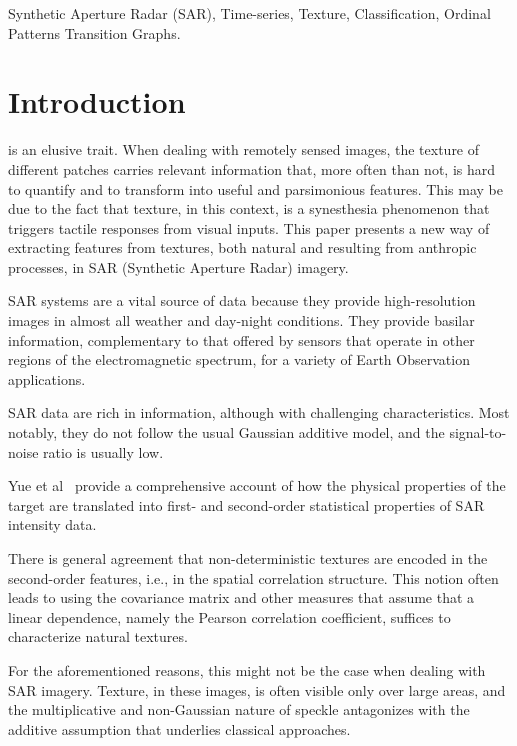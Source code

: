 \documentclass[journal]{IEEEtran}
\begin{document}
\begin{IEEEkeywords}
	Synthetic Aperture Radar (SAR), 
	Time-series, 
	Texture, 
	Classification, 
	Ordinal Patterns Transition Graphs.
\end{IEEEkeywords}

\IEEEpeerreviewmaketitle

\section{Introduction}

 is an elusive trait.
When dealing with remotely sensed images, the texture of different patches carries relevant information that, more often than not, is hard to quantify and to transform into useful and parsimonious features.
This may be due to the fact that texture, in this context, is a synesthesia phenomenon that triggers tactile responses from visual inputs.
This paper presents a new way of extracting features from textures, both natural and resulting from anthropic processes, in SAR (Synthetic Aperture Radar) imagery.

SAR systems are a vital source of data because they provide high-resolution images in almost all weather and day-night conditions.
They provide basilar information, complementary to that offered by sensors that operate in other regions of the electromagnetic spectrum, for a variety of Earth Observation applications.

SAR data are rich in information, although with challenging characteristics.
Most notably, they do not follow the usual Gaussian additive model, and the signal-to-noise ratio is usually low.

Yue et al~\cite{Yue2020Gaussian} provide a comprehensive account of how the physical properties of the target are translated into first- and second-order statistical properties of SAR intensity data.

There is general agreement that non-deterministic textures are encoded in the second-order features, i.e., in the spatial correlation structure.
This notion often leads to using the covariance matrix and other measures that assume that a linear dependence, namely the Pearson correlation coefficient, suffices to characterize natural textures.

For the aforementioned reasons, this might not be the case when dealing with SAR imagery.
Texture, in these images, is often visible only over large areas, and the multiplicative and non-Gaussian nature of speckle antagonizes with the additive assumption that underlies classical approaches.
\end{document}
